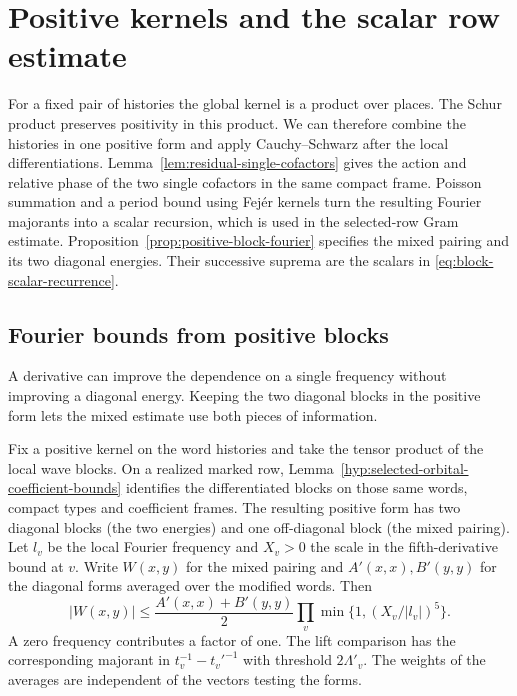 \section{Positive kernels and the scalar row estimate}\label{sec:block-recursion}
\hypertarget{source-block-recursion}{}

For a fixed pair of histories the global kernel is a product over places. The Schur product preserves positivity in this product. We can therefore combine the histories in one positive form and apply Cauchy--Schwarz after the local differentiations. Lemma~\ref{lem:residual-single-cofactors} gives the action and relative phase of the two single cofactors in the same compact frame. Poisson summation and a period bound using Fej\'er
kernels turn the resulting Fourier majorants into a scalar
recursion, which is used in the selected-row Gram estimate. Proposition~\ref{prop:positive-block-fourier} specifies the mixed pairing and its two diagonal energies. Their successive suprema are the scalars in \eqref{eq:block-scalar-recurrence}.

\subsection{Fourier bounds from positive blocks}

A derivative can improve the dependence on a single frequency without improving a diagonal energy. Keeping the two diagonal blocks in the positive form lets the mixed estimate use both pieces of information.

\begin{proposition}\label{prop:positive-block-fourier}
Fix a positive kernel on the word histories and take the tensor product of the local wave blocks. On a realized marked row, Lemma~\ref{hyp:selected-orbital-coefficient-bounds} identifies the differentiated blocks on those same words, compact types and coefficient frames. The resulting positive form has two diagonal blocks (the two energies) and one off-diagonal block (the mixed pairing).
Let \(l_v\) be the local Fourier frequency and \(X_v>0\) the scale in the fifth-derivative bound at \(v\). Write \(W(x,y)\) for the mixed pairing and \(A'(x,x),B'(y,y)\) for the diagonal forms averaged over the modified words. Then 
\[
 |W(x,y)|\le \frac{A'(x,x)+B'(y,y)}{2}\prod_v\min\{1,(X_v/|l_v|)^5\}.
\]
 A zero frequency contributes a factor of one. The lift comparison has the corresponding majorant in \(t_v^{-1}-t_v'^{-1}\)
with threshold \(2\Lambda'_v\). The weights of the averages
are independent of the vectors testing the forms.
\end{proposition}

